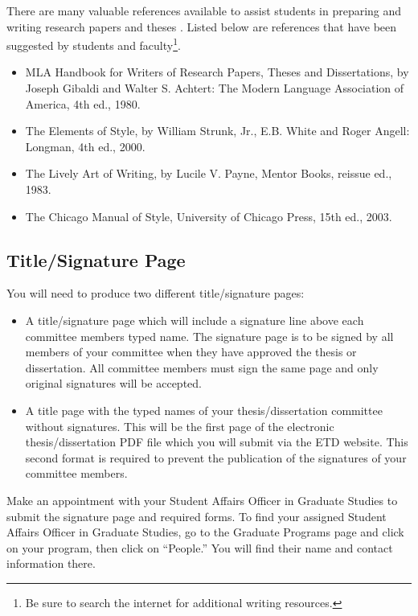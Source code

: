 There are many valuable references available to assist students in preparing and writing research papers and theses \cite{Gibaldi:80, Strunk:00, UoCPress:03}. Listed below are references that have been suggested by students and faculty\footnote{Be sure to search the internet for additional writing resources.}.
%
\begin{itemize}
\item MLA Handbook for Writers of Research Papers, Theses and Dissertations, by Joseph Gibaldi
    and Walter S. Achtert: The Modern Language Association of America, 4th ed., 1980.
\item The Elements of Style, by William Strunk, Jr., E.B. White and Roger Angell: Longman, 4th ed., 2000.
\item The Lively Art of Writing, by Lucile V. Payne, Mentor Books, reissue ed., 1983.
\item The Chicago Manual of Style, University of Chicago Press, 15th ed., 2003.
\end{itemize}

\subsection{Title/Signature Page}
%
You will need to produce two different title/signature pages:

    \begin{itemize}
      \item A title/signature page which will include a signature line above each committee members typed name. The signature page is to be signed by all members of your committee when they have approved the thesis or dissertation. All committee members must sign the same page and only original signatures will be accepted.
      \item A title page with the typed names of your thesis/dissertation committee without signatures. This will be the first page of the electronic thesis/dissertation PDF file which you will submit via the ETD website.  This second format is required to prevent the publication of the signatures of your committee members.
    \end{itemize}
    
Make an appointment with your Student Affairs Officer in Graduate Studies to submit the signature page and required forms. To find your assigned Student Affairs Officer in Graduate Studies, go to the Graduate Programs page and click on your program, then click on ``People.''  You will find their name and contact information there.

